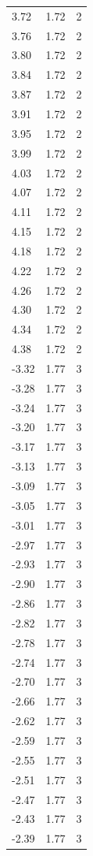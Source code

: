 \begin{longtable}{lrr}
  3.72 & 1.72 & 2 \\
  3.76 & 1.72 & 2 \\
  3.80 & 1.72 & 2 \\
  3.84 & 1.72 & 2 \\
  3.87 & 1.72 & 2 \\
  3.91 & 1.72 & 2 \\
  3.95 & 1.72 & 2 \\
  3.99 & 1.72 & 2 \\
  4.03 & 1.72 & 2 \\
  4.07 & 1.72 & 2 \\
  4.11 & 1.72 & 2 \\
  4.15 & 1.72 & 2 \\
  4.18 & 1.72 & 2 \\
  4.22 & 1.72 & 2 \\
  4.26 & 1.72 & 2 \\
  4.30 & 1.72 & 2 \\
  4.34 & 1.72 & 2 \\
  4.38 & 1.72 & 2 \\
  -3.32 & 1.77 & 3 \\
  -3.28 & 1.77 & 3 \\
  -3.24 & 1.77 & 3 \\
  -3.20 & 1.77 & 3 \\
  -3.17 & 1.77 & 3 \\
  -3.13 & 1.77 & 3 \\
  -3.09 & 1.77 & 3 \\
  -3.05 & 1.77 & 3 \\
  -3.01 & 1.77 & 3 \\
  -2.97 & 1.77 & 3 \\
  -2.93 & 1.77 & 3 \\
  -2.90 & 1.77 & 3 \\
  -2.86 & 1.77 & 3 \\
  -2.82 & 1.77 & 3 \\
  -2.78 & 1.77 & 3 \\
  -2.74 & 1.77 & 3 \\
  -2.70 & 1.77 & 3 \\
  -2.66 & 1.77 & 3 \\
  -2.62 & 1.77 & 3 \\
  -2.59 & 1.77 & 3 \\
  -2.55 & 1.77 & 3 \\
  -2.51 & 1.77 & 3 \\
  -2.47 & 1.77 & 3 \\
  -2.43 & 1.77 & 3 \\
  -2.39 & 1.77 & 3 \\

\end{longtable}

